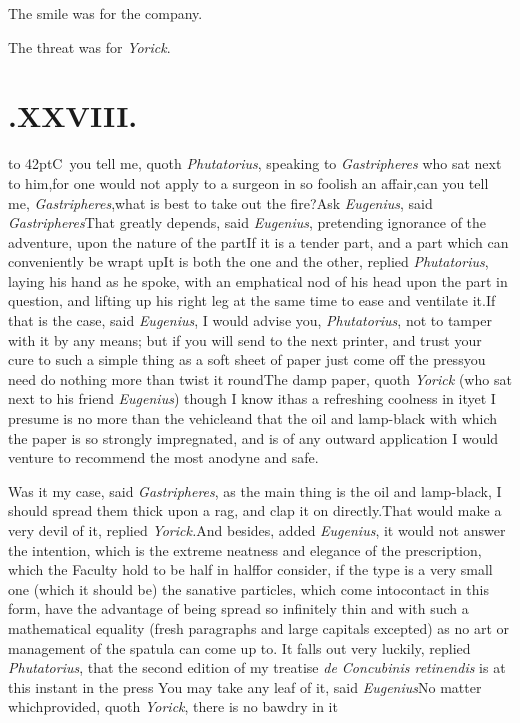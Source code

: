 \documentclass{article}
\begin{document}
\tsk The smile was for the company.

\tsk The threat was for \textit{Yorick}.

\bigskip
\section{.\enspace XXVIII.}

\lettrine{\hskip-3pt\hbox to 42pt{\Tsk C}}{\,} you tell me, quoth
\textit{Phuta\-torius}, speaking to \textit{Gastripheres} who sat next to him,\tsk for
one would not apply to a surgeon in so foolish an affair,\tsk can you tell me,
\textit{Gastripheres},\pb what is best to take out the fire?\tsk Ask \textit{Eugenius},
said \textit{Gastripheres}\tsk That greatly depends, said \textit{Eugenius},
pretending ignorance of the adventure, upon the nature of the part\tsk If it is a
tender part, and a part which can conveniently be wrapt up\tsk It is both the one
and the other, replied \textit{Phutatorius}, laying his hand as he spoke, with an
emphatical nod of his head upon the part in question, and lifting up his right leg
at the same time to ease and ventilate it.\tsh If that is the case, said
\textit{Eugenius}, I would advise you, \textit{Phutatorius}, not to tamper with it
by any means; but if you will send to the next printer, and trust your cure to such
a simple thing as a soft sheet of paper just come off the press\tsk you need do
nothing more than twist it round\tsk The damp paper, quoth \textit{Yorick} (who sat
next to his friend \textit{Eugenius}) though I know it\pb has a refreshing coolness in
it\tsk yet I presume is no more than the vehicle\tsk and that the oil and lamp-black
with which the paper is so strongly impregnated,\break
{}
and is of any outward application I would venture to recommend
the most anodyne and safe.

Was it my case, said \textit{Gastripheres}, as the main thing is the oil and
lamp-black, I should spread them thick upon a rag, and clap it on directly.\tsh That
would make a very devil of it, replied \textit{Yorick.}\tsh And besides, added
\textit{Eugenius}, it would not answer the intention, which is the extreme neatness
and elegance of the prescription, which the Faculty hold to be half in half\tsk for
consider, if the type is a very small one (which it should be) the sanative
particles, which come into\pb contact in this form, have the advantage of being spread
so infinitely thin and with such a mathematical equality (fresh paragraphs and
large capitals excepted) as no art or management of the spatula can come up to.
It falls out very luckily, replied \textit{Phutatorius}, that the second edition of
my treatise \textit{de Concubinis retinendis} is at this instant in the press\tsk
You may take any leaf of it, said \textit{Eugenius}\tsk No matter which\tsk provided,
quoth \textit{Yorick}, there is no bawdry in it\tsh
\end{document}
